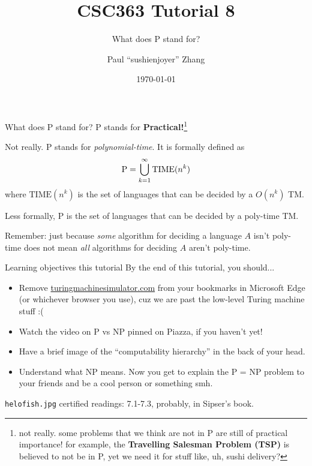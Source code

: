 \documentclass{beamer}
\title{CSC363 Tutorial 8}
\subtitle{What does P stand for?}
\date{\today}
\author{Paul ``sushi{\textunderscore}enjoyer'' Zhang}
\institute{University of Humongus Chungus Amogus Pekora\emojicarrot}
\begin{document}
\maketitle

\begin{frame}{What does P stand for?}
P stands for \textbf{Practical!}\footnote{not really. some problems that we think are not in P are still of practical importance! for example, the \textbf{Travelling Salesman Problem (TSP)} is believed to not be in P, yet we need it for stuff like, uh, sushi delivery? \emojisushi \emojisushi}

\vspace{2mm}

\pause

Not really. P stands for \textit{polynomial-time}. It is formally defined as $$ \text P = \bigcup_{k = 1}^\infty \text{TIME}(n^k)$$
where $\text{TIME}(n^k)$ is the set of languages that can be decided by a $O(n^k)$ TM.

\vspace{2mm}

\pause

Less formally, P is the set of languages that can be decided by a poly-time TM.

\vspace{2mm}

Remember: just because \textit{some} algorithm for deciding a language $A$ isn't poly-time does not mean \textit{all} algorithms for deciding $A$ aren't poly-time.
\end{frame}

\begin{frame}{Learning objectives this tutorial}
By the end of this tutorial, you should...
\begin{itemize}
\item Remove \url{turingmachinesimulator.com} from your bookmarks in Microsoft Edge (or whichever browser you use), cuz we are past the low-level Turing machine stuff :(
\item Watch the video on P vs NP pinned on Piazza, if you haven't yet!
\item Have a brief image of the ``computability hierarchy'' in the back of your head.
\item Understand what NP means. Now you get to explain the P = NP problem to your friends and be a cool person or something smh.
\end{itemize}
\texttt{helo\textunderscore fish.jpg} certified readings: 7.1-7.3, probably, in Sipser's book.
\end{frame}
\end{document}
